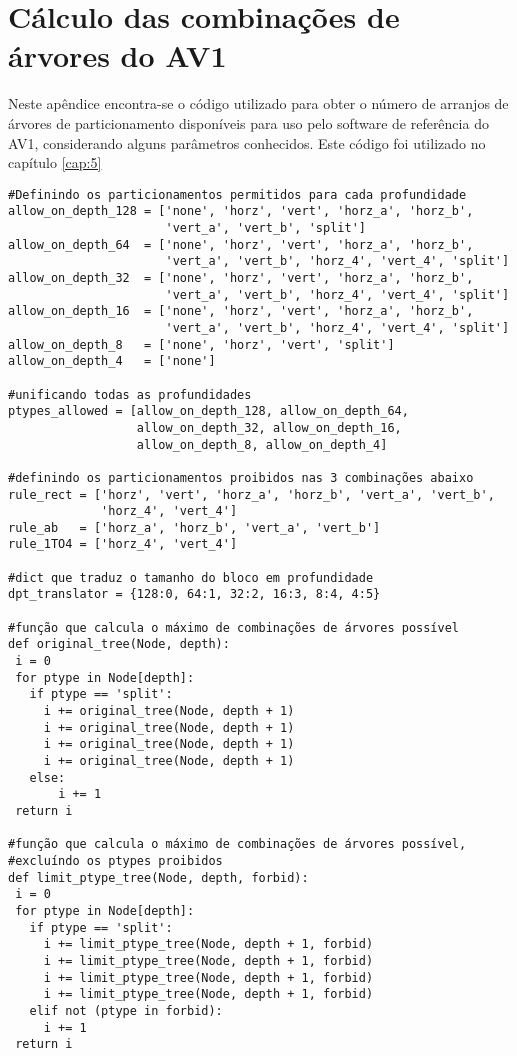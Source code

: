 \chapter{Cálculo das combinações de árvores do AV1}
\label{apx:B}

Neste apêndice encontra-se o código utilizado para obter o número de arranjos de árvores de particionamento disponíveis para uso pelo software de referência do AV1, considerando alguns parâmetros conhecidos. Este código foi utilizado no capítulo \ref{cap:5}

\begin{verbatim}
#Definindo os particionamentos permitidos para cada profundidade
allow_on_depth_128 = ['none', 'horz', 'vert', 'horz_a', 'horz_b', 
                      'vert_a', 'vert_b', 'split']
allow_on_depth_64  = ['none', 'horz', 'vert', 'horz_a', 'horz_b', 
                      'vert_a', 'vert_b', 'horz_4', 'vert_4', 'split']
allow_on_depth_32  = ['none', 'horz', 'vert', 'horz_a', 'horz_b', 
                      'vert_a', 'vert_b', 'horz_4', 'vert_4', 'split']
allow_on_depth_16  = ['none', 'horz', 'vert', 'horz_a', 'horz_b', 
                      'vert_a', 'vert_b', 'horz_4', 'vert_4', 'split']
allow_on_depth_8   = ['none', 'horz', 'vert', 'split']
allow_on_depth_4   = ['none']
 
#unificando todas as profundidades
ptypes_allowed = [allow_on_depth_128, allow_on_depth_64, 
                  allow_on_depth_32, allow_on_depth_16, 
                  allow_on_depth_8, allow_on_depth_4]
 
#definindo os particionamentos proibidos nas 3 combinações abaixo
rule_rect = ['horz', 'vert', 'horz_a', 'horz_b', 'vert_a', 'vert_b', 
             'horz_4', 'vert_4']
rule_ab   = ['horz_a', 'horz_b', 'vert_a', 'vert_b']
rule_1TO4 = ['horz_4', 'vert_4']
 
#dict que traduz o tamanho do bloco em profundidade
dpt_translator = {128:0, 64:1, 32:2, 16:3, 8:4, 4:5}

#função que calcula o máximo de combinações de árvores possível
def original_tree(Node, depth):
 i = 0
 for ptype in Node[depth]:
   if ptype == 'split':
     i += original_tree(Node, depth + 1)
     i += original_tree(Node, depth + 1)
     i += original_tree(Node, depth + 1)
     i += original_tree(Node, depth + 1)
   else:
       i += 1
 return i
 
#função que calcula o máximo de combinações de árvores possível,
#excluíndo os ptypes proibidos
def limit_ptype_tree(Node, depth, forbid):
 i = 0
 for ptype in Node[depth]:
   if ptype == 'split':
     i += limit_ptype_tree(Node, depth + 1, forbid)
     i += limit_ptype_tree(Node, depth + 1, forbid)
     i += limit_ptype_tree(Node, depth + 1, forbid)
     i += limit_ptype_tree(Node, depth + 1, forbid)
   elif not (ptype in forbid):
     i += 1
 return i
 

\end{verbatim}
